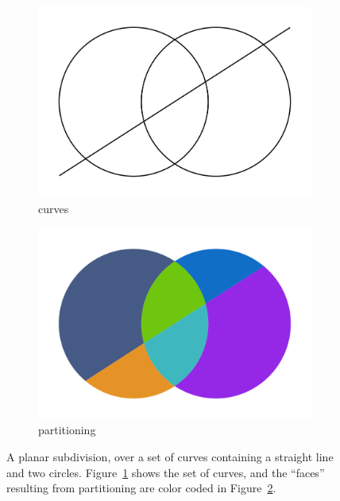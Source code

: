 \begin{figure}%
  \centering
  \begin{subfigure}{.4\textwidth}
    \includegraphics[width=\textwidth]{figures/intro_curves2.png}
    \caption{curves} \label{subfig:intro_curves2}
  \end{subfigure}%
  \quad \quad \quad%
  \begin{subfigure}{.4\textwidth}
    \includegraphics[width=\textwidth]{figures/intro_partitioning2.png}
    \caption{partitioning} \label{subfig:intro_partitioning2}
  \end{subfigure}%
  \caption[xxx]
          {A planar subdivision, over a set of curves containing a straight line and two circles.
          Figure~\ref{subfig:intro_curves2} shows the set of curves, and the ``faces'' resulting from partitioning are color coded in Figure~\ref{subfig:intro_partitioning2}.}
  \label{fig:intro_curvesPartitioning2}
\end{figure}

